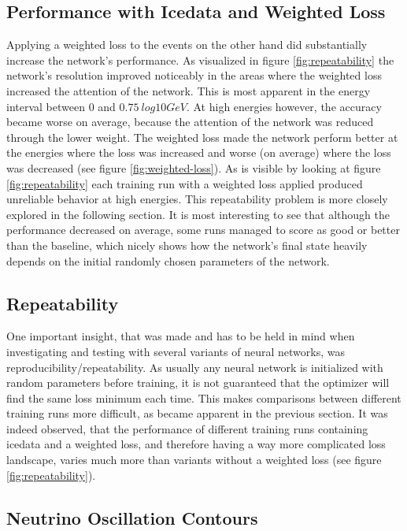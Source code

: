 \documentclass[a4paper,10pt]{scrartcl}
\begin{document}
\subsection{Performance with Icedata and Weighted Loss}

Applying a weighted loss to the events on the other hand did substantially increase the network's performance.
As visualized in figure \ref{fig:repeatability} the network's resolution improved noticeably in the areas where the weighted loss increased the attention of the network.
This is most apparent in the energy interval between $0$ and $\SI{0.75}{log10 GeV}$.
At high energies however, the accuracy became worse on average, because the attention of the network was reduced through the lower weight.
The weighted loss made the network perform better at the energies where the loss was increased and worse (on average) where the loss was decreased (see figure \ref{fig:weighted-loss}).
As is visible by looking at figure \ref{fig:repeatability} each training run with a weighted loss applied produced unreliable behavior at high energies.
This repeatability problem is more closely explored in the following section.
It is most interesting to see that although the performance decreased on average, some runs managed to score as good or better than the baseline, which nicely shows how the network's final state heavily depends on the initial randomly chosen parameters of the network.

\subsection{Repeatability}

One important insight, that was made and has to be held in mind when investigating and testing with several variants of neural networks, was reproducibility/repeatability.
As usually any neural network is initialized with random parameters before training, it is not guaranteed that the optimizer will find the same loss minimum each time.
This makes comparisons between different training runs more difficult, as became apparent in the previous section.
It was indeed observed, that the performance of different training runs containing icedata and a weighted loss, and therefore having a way more complicated loss landscape, varies much more than variants without a weighted loss (see figure \ref{fig:repeatability}).

\subsection{Neutrino Oscillation Contours}
\end{document}
